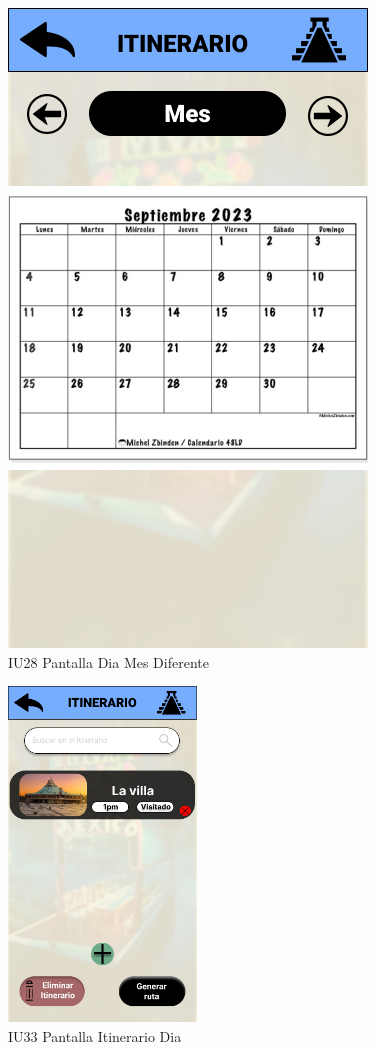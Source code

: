 \newpage
\begin{figure}[htb]
        \centering
        \includegraphics[width=.7\linewidth]{Pantallas Prototipo3/IU28 Pantalla Dia Mes Diferente.jpg}
        \caption{IU28 Pantalla Dia Mes Diferente}
\end{figure}
\newpage
\begin{figure}[htbp]
        \centering
        \includegraphics[width= 5cm]{Pantallas Prototipo3/IU33 Pantalla Itinerario Dia.jpg}
        \caption{IU33 Pantalla Itinerario Dia}
        \label{fig:enter-label}
        \vspace{200pt}
\end{figure}